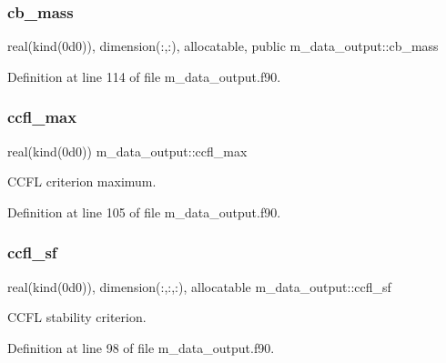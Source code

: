 \subsubsection{\texorpdfstring{cb\+\_\+mass}{cb\_mass}}
{\footnotesize\ttfamily real(kind(0d0)), dimension(\+:,\+:), allocatable, public m\+\_\+data\+\_\+output\+::cb\+\_\+mass}



Definition at line 114 of file m\+\_\+data\+\_\+output.\+f90.

\mbox{\label{namespacem__data__output_afc429263f629a2ba4b5655dec5fd2509}} 
\subsubsection{\texorpdfstring{ccfl\+\_\+max}{ccfl\_max}}
{\footnotesize\ttfamily real(kind(0d0)) m\+\_\+data\+\_\+output\+::ccfl\+\_\+max}



C\+C\+FL criterion maximum. 



Definition at line 105 of file m\+\_\+data\+\_\+output.\+f90.

\mbox{\label{namespacem__data__output_a660d600ba9338118f6992a0d76bd6a68}} 
\subsubsection{\texorpdfstring{ccfl\+\_\+sf}{ccfl\_sf}}
{\footnotesize\ttfamily real(kind(0d0)), dimension(\+:,\+:,\+:), allocatable m\+\_\+data\+\_\+output\+::ccfl\+\_\+sf}



C\+C\+FL stability criterion. 



Definition at line 98 of file m\+\_\+data\+\_\+output.\+f90.

\mbox{\label{namespacem__data__output_a4f2a6c0ed44fb82d337013e700479ce5}} 
